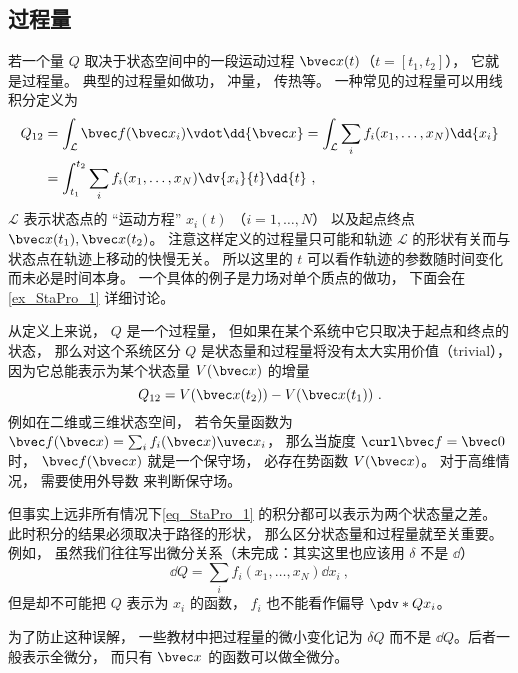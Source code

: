 \subsection{过程量}
若一个量 $Q$ 取决于状态空间中的一段运动过程 $\bvec x(t)$（$t = [t_1,t_2]$）， 它就是过程量。  典型的过程量如做功， 冲量， 传热等。 一种常见的过程量可以用线积分定义为
\begin{equation}\label{eq_StaPro_1}
\begin{aligned}
Q_{12} &= \int_{\mathcal L} \bvec f(\bvec x_i) \vdot \dd{\bvec x} = \int_{\mathcal L} \sum_i f_i(x_1, \dots, x_N) \dd{x_i}\\
&= \int_{t_1}^{t_2} \sum_i f_i(x_1, \dots, x_N) \dv{x_i}{t} \dd{t}~,
\end{aligned}
\end{equation}
$\mathcal L$ 表示状态点的 “运动方程” $x_i(t)$ （$i = 1,\dots, N$） 以及起点终点 $\bvec x(t_1), \bvec x(t_2)$。 注意这样定义的过程量只可能和轨迹 $\mathcal L$ 的形状有关而与状态点在轨迹上移动的快慢无关。 所以这里的 $t$ 可以看作轨迹的参数随时间变化而未必是时间本身。 一个具体的例子是力场对单个质点的做功， 下面会在\autoref{ex_StaPro_1} 详细讨论。


从定义上来说， $Q$ 是一个过程量， 但如果在某个系统中它只取决于起点和终点的状态， 那么对这个系统区分 $Q$ 是状态量和过程量将没有太大实用价值（trivial），因为它总能表示为某个状态量 $V(\bvec x)$ 的增量
\begin{equation}
Q_{12} = V(\bvec x(t_2)) - V(\bvec x(t_1))~.
\end{equation}
例如在二维或三维状态空间， 若令矢量函数为 $\bvec f(\bvec x) = \sum_i f_i(\bvec x) \uvec x_i$， 那么当旋度 $\curl \bvec f = \bvec 0$ 时， $\bvec f(\bvec x)$ 就是一个保守场， 必存在势函数 $V(\bvec x)$。 对于高维情况， 需要使用外导数 来判断保守场。

但事实上远非所有情况下\autoref{eq_StaPro_1} 的积分都可以表示为两个状态量之差。 此时积分的结果必须取决于路径的形状， 那么区分状态量和过程量就至关重要。 例如， 虽然我们往往写出微分关系（未完成：其实这里也应该用 $\delta$ 不是 $\dd{}$）
\begin{equation}
\dd Q = \sum_i f_i(x_1, \dots, x_N) \dd{x_i}~,
\end{equation}
但是却不可能把 $Q$ 表示为 $x_i$ 的函数， $f_i$ 也不能看作偏导 $\pdv*{Q}{x_i}$。

为了防止这种误解， 一些教材中把过程量的微小变化记为 $\delta Q$ 而不是 $\dd Q$。后者一般表示全微分， 而只有 $\bvec x$ 的函数可以做全微分。

